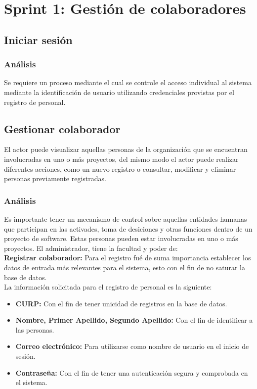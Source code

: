 \section{Sprint 1: Gestión de colaboradores}

\subsection{Iniciar sesión}
\subsubsection {Análisis}
Se requiere un proceso mediante el cual se controle el acceso individual al sistema mediante la identificación de usuario utilizando credenciales provistas por el registro de personal.\\

\subsection{Gestionar colaborador}
El actor puede visualizar aquellas personas de la organización que se encuentran involucradas en uno o más proyectos, del  mismo modo el actor puede realizar diferentes acciones, como un nuevo registro o consultar, modificar y eliminar personas previamente registradas.

\subsubsection {Análisis}
Es importante tener un mecanismo de control sobre aquellas entidades humanas que participan en las activades, toma de desiciones y otras funciones dentro de un proyecto de software. Estas personas pueden estar involucradas en uno o más proyectos.
\bigskip
El administrador, tiene la facultad y poder de:\\

\textbf {Registrar colaborador:} Para el registro fué de suma importancia establecer los datos de entrada más relevantes para el sistema, esto con el fin de no saturar la base de datos.\\

La información solicitada para el registro de personal es la siguiente:

\begin{itemize}
	\item \textbf{CURP:} Con el fin de tener unicidad de registros en la base de datos.
	\item \textbf{Nombre, Primer Apellido, Segundo Apellido:} Con el fin de identificar a las personas.
	\item \textbf{Correo electrónico:} Para utilizarse como nombre de usuario en el inicio de sesión.
	\item \textbf{Contraseña:} Con el fin de tener una autenticación segura y comprobada en el sistema.
\end{itemize}


